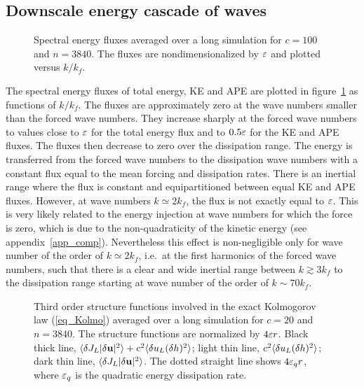 

\subsection{Downscale energy cascade of waves}
\label{subsection_cascade}



\begin{figure}
\caption{Spectral energy fluxes averaged over a long simulation for $c
= 100$ and $n = 3840$.  The fluxes are nondimensionalized by $\varepsilon$
and plotted versus $k/k_f$.  }
\label{fig_seb}
\end{figure}


The spectral energy fluxes of total energy, KE and APE are plotted in
figure~\ref{fig_seb} as functions of $k/k_f$.
%
The fluxes are approximately zero at the wave numbers smaller than the
forced wave numbers.  They increase sharply at the forced wave numbers
to values close to $\varepsilon$ for the total energy flux and to $0.5\varepsilon$
for the KE and APE fluxes.  The fluxes then decrease to zero over the
dissipation range.
%
The energy is transferred from the forced wave numbers to the
dissipation wave numbers with a constant flux equal to the mean
forcing and dissipation rates.
%
There is an inertial range where the flux is constant and
equipartitioned between equal KE and APE fluxes.
%
However, at wave numbers $k \simeq 2 k_f$, the flux is not exactly
equal to $\varepsilon$.  This is very likely related to the energy injection
at wave numbers for which the force is zero, which is due to the
non-quadraticity of the kinetic energy (see appendix~\ref{app_comp}).
%
Nevertheless this effect is non-negligible only for wave number of the
order of $k\simeq 2 k_f$, i.e.\ at the first harmonics of the forced
wave numbers, such that there is a clear and wide inertial range
between $k\gtrsim 3 k_f$ to the dissipation range starting at wave
number of the order of $k \sim 70 k_f$.




\begin{figure}
\caption{
Third order structure functions involved in the exact Kolmogorov law (\ref{eq_Kolmo}) 
averaged over a long simulation for $c = 20$ and $n = 3840$.
%
The structure functions are normalized by $4 \varepsilon r$.
%
Black thick line, $\langle  \delta J_L|\delta \textbf{u}|^2  \rangle 
+ c^2\langle \delta u_L(\delta h)^2 \rangle$;
light thin line, $c^2\langle \delta u_L (\delta h)^2 \rangle$;
dark thin line, $\langle \delta J_L |\delta \textbf{u}|^2 \rangle$.
%
The dotted straight line shows $4 \varepsilon_q r$, 
where $\varepsilon_q$ is the quadratic energy dissipation rate.
}
\label{fig_Kolmo}
\end{figure}


